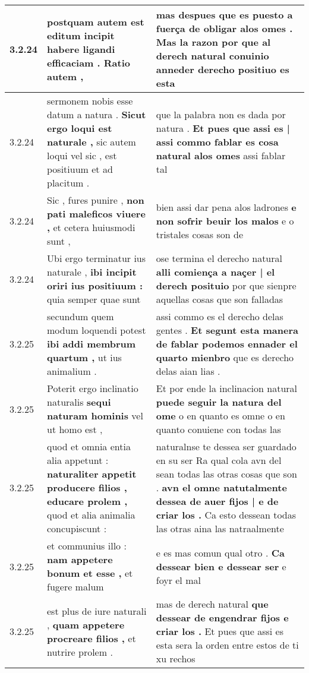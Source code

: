 \begin{tabular}{|p{1cm}|p{6.5cm}|p{6.5cm}|}
3.2.24 & postquam autem est editum incipit \textbf{ habere ligandi efficaciam . } Ratio autem , & mas despues que es puesto a fuerça \textbf{ de obligar alos omes . } Mas la razon por que al derech natural conuinio anneder derecho positiuo es esta \\\hline
3.2.24 & sermonem nobis esse datum a natura . \textbf{ Sicut ergo loqui est naturale , } sic autem loqui vel sic , est positiuum et ad placitum . & que la palabra non es dada por natura . \textbf{ Et pues que assi es | assi commo fablar es cosa natural alos omes } assi fablar tal \\\hline
3.2.24 & Sic , fures punire , \textbf{ non pati maleficos viuere , } et cetera huiusmodi sunt , & bien assi dar pena alos ladrones \textbf{ e non sofrir beuir los malos } e o tristales cosas son de \\\hline
3.2.24 & Ubi ergo terminatur ius naturale , \textbf{ ibi incipit oriri ius positiuum : } quia semper quae sunt & ose termina el derecho natural \textbf{ alli comiença a naçer | el derech posituio } por que sienpre aquellas cosas que son falladas \\\hline
3.2.25 & secundum quem modum loquendi potest \textbf{ ibi addi membrum quartum , } ut ius animalium . & assi commo es el derecho delas gentes . \textbf{ Et segunt esta manera de fablar podemos ennader el quarto mienbro } que es derecho delas aian lias . \\\hline
3.2.25 & Poterit ergo inclinatio naturalis \textbf{ sequi naturam hominis } vel ut homo est , & Et por ende la inclinacion natural \textbf{ puede seguir la natura del ome } o en quanto es omne o en quanto conuiene con todas las \\\hline
3.2.25 & quod et omnia entia alia appetunt : \textbf{ naturaliter appetit producere filios , educare prolem , } quod et alia animalia concupiscunt : & naturalnse te dessea ser guardado en su ser Ra qual cola avn del sean todas las otras cosas que son . \textbf{ avn el omne natutalmente dessea de auer fijos | e de criar los . } Ca esto dessean todas las otras aina las natraalmente \\\hline
3.2.25 & et communius illo : \textbf{ nam appetere bonum et esse , } et fugere malum & e es mas comun qual otro . \textbf{ Ca dessear bien e dessear ser } e foyr el mal \\\hline
3.2.25 & est plus de iure naturali , \textbf{ quam appetere procreare filios , } et nutrire prolem . & mas de derech natural \textbf{ que dessear de engendrar fijos e criar los . } Et pues que assi es esta sera la orden entre estos de ti xu rechos \\\hline

\end{tabular}
